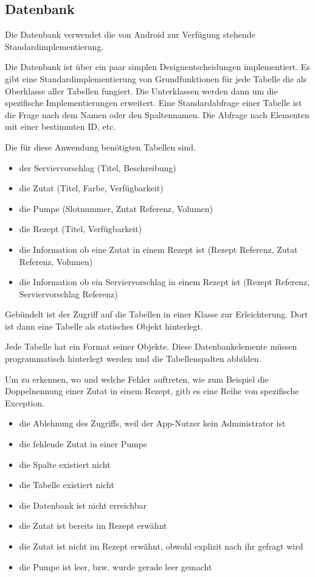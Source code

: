 \subsection{Datenbank}

Die Datenbank verwendet die von Android zur Verfügung stehende Standardimplementierung. 
 
Die Datenbank ist über ein paar simplen Designentscheidungen implementiert. Es gibt eine Standardimplementierung von Grundfunktionen für jede Tabelle die als Oberklasse aller Tabellen fungiert. Die Unterklassen werden dann um die spezifische Implementierungen erweitert. Eine Standardabfrage einer Tabelle ist die Frage nach dem Namen oder den Spaltennamen. Die Abfrage nach Elementen mit einer bestimmten ID, etc. 
 
Die für diese Anwendung benötigten Tabellen sind. 
\begin{itemize}
	\item der Serviervorschlag (Titel, Beschreibung)
	\item die Zutat (Titel, Farbe, Verfügbarkeit)
	\item die Pumpe (Slotnummer, Zutat Referenz, Volumen)
	\item die Rezept (Titel, Verfügbarkeit)
	\item die Information ob eine Zutat in einem Rezept ist (Rezept Referenz, Zutat Referenz, Volumen)
	\item die Information ob ein Serviervorschlag in einem Rezept ist (Rezept Referenz, Serviervorschlag Referenz)
\end{itemize}
 
Gebündelt ist der Zugriff auf die Tabellen in einer Klasse zur Erleichterung. 
Dort ist dann eine Tabelle als statisches Objekt hinterlegt. 
 
Jede Tabelle hat ein Format seiner Objekte. Diese Datenbankelemente müssen programmatisch hinterlegt werden und die Tabellenspalten abbilden. 
 
Um zu erkennen, wo und welche Fehler auftreten, wie zum Beispiel die Doppelnennung einer Zutat in einem Rezept, gitb es eine Reihe von spezifische Exception. 
\begin{itemize}
 	\item die Ablehnung des Zugriffs, weil der App-Nutzer kein Administrator ist
 	\item die fehlende Zutat in einer Pumpe
 	\item die Spalte existiert nicht
 	\item die Tabelle existiert nicht
 	\item die Datenbank ist nicht erreichbar
 	\item die Zutat ist bereits im Rezept erwähnt
 	\item die Zutat ist nicht im Rezept erwähnt, obwohl explizit nach ihr gefragt wird
 	\item die Pumpe ist leer, bzw. wurde gerade leer gemacht
\end{itemize}
 

